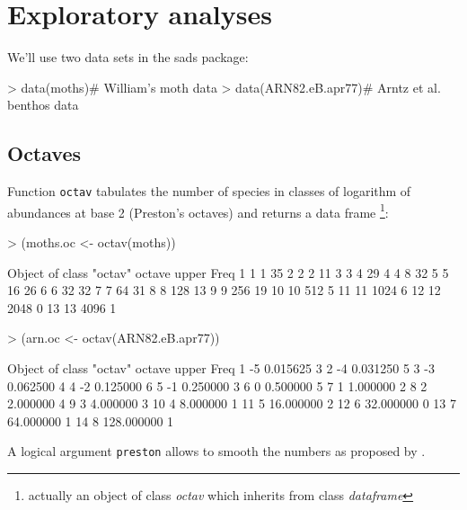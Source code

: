 \documentclass[11pt, A4]{article}
\newcommand{\code}[1]{\texttt{#1}}
\begin{document}
\section{Exploratory analyses}
\label{sec:analise-exploratoria}

We'll use two data sets in the sads package:
\begin{Schunk}
\begin{Sinput}
> data(moths)# William's moth data
> data(ARN82.eB.apr77)# Arntz et al. benthos data
\end{Sinput}
\end{Schunk}

\subsection{Octaves}
\label{sec:oitavas}

Function \code{octav} tabulates the number of species in classes
of logarithm of abundances at base 2 (Preston's octaves) and returns a data frame 
\footnote{actually an object of class \emph{octav} which inherits from class \emph{dataframe}}:

\begin{Schunk}
\begin{Sinput}
> (moths.oc <- octav(moths))
\end{Sinput}
\begin{Soutput}
Object of class "octav"
   octave upper Freq
1       1     1   35
2       2     2   11
3       3     4   29
4       4     8   32
5       5    16   26
6       6    32   32
7       7    64   31
8       8   128   13
9       9   256   19
10     10   512    5
11     11  1024    6
12     12  2048    0
13     13  4096    1
\end{Soutput}
\begin{Sinput}
> (arn.oc <- octav(ARN82.eB.apr77))
\end{Sinput}
\begin{Soutput}
Object of class "octav"
   octave      upper Freq
1      -5   0.015625    3
2      -4   0.031250    5
3      -3   0.062500    4
4      -2   0.125000    6
5      -1   0.250000    3
6       0   0.500000    5
7       1   1.000000    2
8       2   2.000000    4
9       3   4.000000    3
10      4   8.000000    1
11      5  16.000000    2
12      6  32.000000    0
13      7  64.000000    1
14      8 128.000000    1
\end{Soutput}
\end{Schunk}

A logical argument
\code{preston} allows to smooth the numbers as proposed by \citet{Preston1948}.
\end{document}
